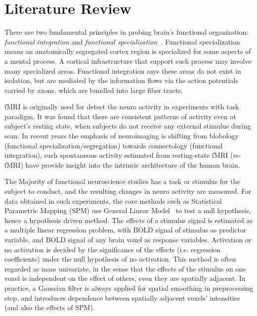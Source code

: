 \documentclass[12pt]{article}
\begin{document}
\section{Literature Review}

There are two fundamental principles in probing brain's functional organization:
\emph{functional integration} and \emph{functional
  specialization}~\cite{friston2007statistical}. Functional specialization means
an anatomically segregated cortex region is specialized for some aspects of a
mental process. A cortical infrastructure that support such process may involve
many specialized areas. Functional integration says these areas do not exist in
isolation, but are mediated by the information flows via the action potentials
carried by axons, which are bundled into large fiber tracts.

fMRI is originally used for detect the neuro activity in experiments with task
paradigm. It was found \cite{raichle2001} that there are consistent patterns of
activity even at subject's resting state, when subjects do not receive any
external stimulus during scan. In recent years the emphasis of neuroimaging is
shifting from blobology (functional specialization/segregation) towards
connectology (functional integration)\cite{Smith20121257}, such spontaneous
activity estimated from resting-state fMRI (rs-fMRI) have provide insight into
the intrinsic architecture of the human brain. 

The Majority of functional neuroscience studies has a task or stimulus for the
subject to conduct, and the resulting changes in neuro activity are
measured. For data obtained in such experiments, the core methods such as
Statistical Parametric Mapping (SPM) use General Linear
Model~\cite{worsley_analysis_1995} to test a null hypothesis, hence a hypothesis
driven method. The effects of a stimulus signal is estimated as a multiple
linear regression problem, with BOLD signal of stimulus as predictor variable,
and BOLD signal of any brain voxel as response variables. Activation or no
activation is decided by the significance of the effects (i.e. regression
coefficients) under the null hypothesis of no activation. This method is often
regarded as mass univariate, in the sense that the effects of the stimulus on
one voxel is independent on the effect of others, even they are spatially
adjacent. In practice, a Gaussian filter is always applied for spatial smoothing
in preprocessing step, and introduces dependence between spatially adjacent
voxels' intensities (and also the effects of SPM).
\end{document}
